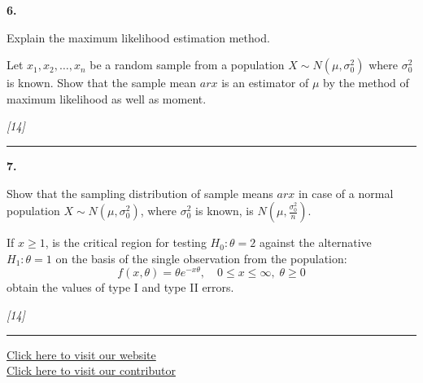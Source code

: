 \documentclass[11pt,a4paper]{article}
\newcommand{\pts}[1]{\hfill   \textit{[#1]}}
\begin{document}
\noindent   \textbf{6.}

\begin{parts}
  \item Explain the maximum likelihood estimation method.
  \item Let $x_1, x_2, \dots, x_n$ be a random sample from a population $X \sim N(\mu, \sigma_0^2)$ where $\sigma_0^2$ is known. Show that the sample mean $ar{x}$ is an estimator of $\mu$ by the method of maximum likelihood as well as moment.
\end{parts}\pts{14}

\medskip\rule{\linewidth}{0.2pt}\medskip




\noindent   \textbf{7.}

\begin{parts}
  \item Show that the sampling distribution of sample means $ar{x}$ in case of a normal population $X \sim N(\mu, \sigma_0^2)$, where $\sigma_0^2$ is known, is $N\left(\mu, \frac{\sigma_0^2}{n}\right)$.
  \item If $x \ge 1$, is the critical region for testing $H_0:  \theta = 2$ against the alternative $H_1:  \theta = 1$ on the basis of the single observation from the population:
  \[
  f(x,  \theta) =  \theta e^{-x \theta}, \quad 0 \le x \le \infty, \;  \theta \ge 0
  \]
  obtain the values of type I and type II errors.
\end{parts}\pts{14}

\vfill
\rule{\linewidth}{0.4pt}

\begin{center}\small
\href{https://bhu-exam.vercel.app/}{Click here to visit our website}\\[4pt]
\href{https://me-aryan.vercel.app/}{Click here to visit our contributor}
\end{center}
\end{document}
